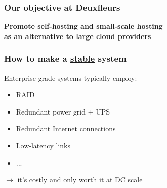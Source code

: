 \documentclass[aspectratio=169]{beamer}
\begin{document}
\begin{frame}
	\frametitle{Our objective at Deuxfleurs}
	
	\begin{center}
		\textbf{Promote self-hosting and small-scale hosting\\
			as an alternative to large cloud providers}
	\end{center}
	\vspace{2em}
\end{frame}

\begin{frame}
	\frametitle{How to make a \underline{stable} system}

	Enterprise-grade systems typically employ:
	\vspace{1em}
	\begin{itemize}
		\item RAID
		\item Redundant power grid + UPS
		\item Redundant Internet connections
		\item Low-latency links
		\item ... 
	\end{itemize}
	\vspace{1em}
	$\to$ it's costly and only worth it at DC scale
\end{frame}
\end{document}
